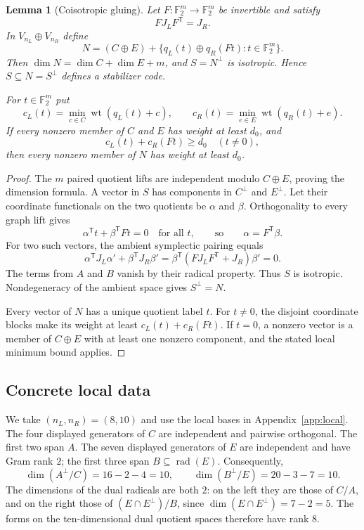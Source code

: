 \documentclass[11pt,a4paper]{article}
\newtheorem{lemma}{Lemma}
\newcommand{\F}{\mathbb F_2}
\newcommand{\wt}{\operatorname{wt}}
\newcommand{\rad}{\operatorname{rad}}
\begin{document}
\begin{lemma}[Coisotropic gluing]\label{lem:gluing}
Let $F:\F^m\to\F^m$ be invertible and satisfy
\begin{equation}\label{eq:poisson}
 FJ_LF^{\mathsf T}=J_R.
\end{equation}
In $V_{n_L}\oplus V_{n_R}$ define
\begin{equation}\label{eq:globalN}
 N=(C\oplus E)+\{q_L(t)\oplus q_R(Ft):t\in\F^m\}.
\end{equation}
Then $\dim N=\dim C+\dim E+m$, and $S=N^\perp$ is isotropic. Hence $S\subseteq N=S^\perp$ defines a stabilizer code.

For $t\in\F^m$ put
\[
 c_L(t)=\min_{c\in C}\wt(q_L(t)+c),\qquad
 c_R(t)=\min_{e\in E}\wt(q_R(t)+e).
\]
If every nonzero member of $C$ and $E$ has weight at least $d_0$, and
\begin{equation}\label{eq:cost}
 c_L(t)+c_R(Ft)\ge d_0\quad(t\ne0),
\end{equation}
then every nonzero member of $N$ has weight at least $d_0$.
\end{lemma}
\begin{proof}
The $m$ paired quotient lifts are independent modulo $C\oplus E$, proving the dimension formula. A vector in $S$ has components in $C^\perp$ and $E^\perp$. Let their coordinate functionals on the two quotients be $\alpha$ and $\beta$. Orthogonality to every graph lift gives
\[
 \alpha^{\mathsf T}t+\beta^{\mathsf T}Ft=0\quad\text{for all }t,
 \qquad\text{so}\qquad \alpha=F^{\mathsf T}\beta.
\]
For two such vectors, the ambient symplectic pairing equals
\[
 \alpha^{\mathsf T}J_L\alpha'+\beta^{\mathsf T}J_R\beta'
 =\beta^{\mathsf T}(FJ_LF^{\mathsf T}+J_R)\beta'=0.
\]
The terms from $A$ and $B$ vanish by their radical property. Thus $S$ is isotropic. Nondegeneracy of the ambient space gives $S^\perp=N$.

Every vector of $N$ has a unique quotient label $t$. For $t\ne0$, the disjoint coordinate blocks make its weight at least $c_L(t)+c_R(Ft)$. If $t=0$, a nonzero vector is a member of $C\oplus E$ with at least one nonzero component, and the stated local minimum bound applies.
\end{proof}

\subsection{Concrete local data}
We take $(n_L,n_R)=(8,10)$ and use the local bases in Appendix~\ref{app:local}. The four displayed generators of $C$ are independent and pairwise orthogonal. The first two span $A$. The seven displayed generators of $E$ are independent and have Gram rank $2$; the first three span $B\subseteq\rad(E)$. Consequently,
\[
 \dim(A^\perp/C)=16-2-4=10,
 \qquad \dim(B^\perp/E)=20-3-7=10.
\]
The dimensions of the dual radicals are both $2$: on the left they are those of $C/A$, and on the right those of $(E\cap E^\perp)/B$, since $\dim(E\cap E^\perp)=7-2=5$. The forms on the ten-dimensional dual quotient spaces therefore have rank $8$.
\end{document}
